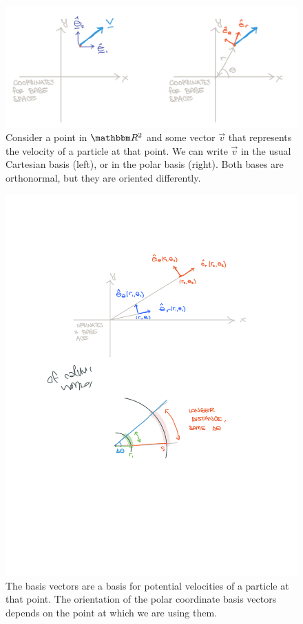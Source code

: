 \documentclass[12pt]{article}
\begin{document}
\begin{figure}[tb]
    \centering
    \includegraphics[width=.8\textwidth]{figures/PolarBasis.pdf}
    \caption{Consider a point in $\RR^2$ and some vector $\vec{v}$ that represents the velocity of a particle at that point. We can write $\vec{v}$ in the usual Cartesian basis (left), or in the polar basis (right). Both bases are orthonormal, but they are oriented differently.}
    \label{fig:polar:coordinate:vs:vector:space}
\end{figure}


\begin{figure}[tb]
    \centering
    \includegraphics[width=.6\textwidth]{figures/polar_different_orientation.pdf}
    \caption{The basis vectors are a basis for potential velocities of a particle at that point. The orientation of the polar coordinate basis vectors depends on the point at which we are using them. }
    \label{fig:polar:coordinate:vs:vector:space:two:points}
\end{figure}
\end{document}
